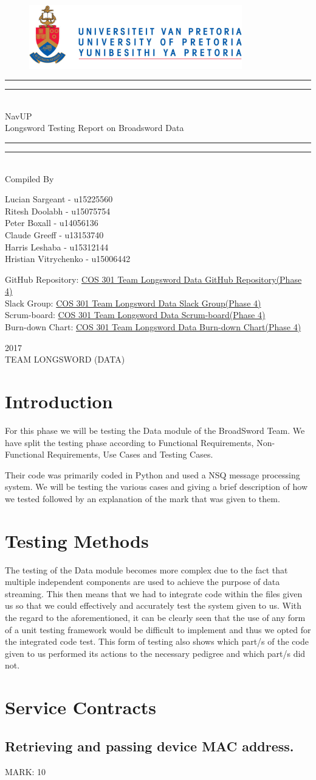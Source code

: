 \documentclass{article}
\newcommand*{\titleGP}{\begingroup
		\begin{figure}[t]
			\centering
			\includegraphics[width=350px]{UP_Logo.PNG}
		\end{figure}
\centering 
\vspace*{\baselineskip}

\rule{\textwidth}{1.6pt}\vspace*{-\baselineskip}\vspace*{2pt}
\rule{\textwidth}{0.4pt}\\[\baselineskip]

{\LARGE NavUP\\ [0.3\baselineskip] Longsword Testing Report on Broadsword Data } \\ [0.2\baselineskip]
\rule{\textwidth}{0.4pt}\vspace*{-\baselineskip}\vspace{3.2pt}
\rule{\textwidth}{1.6pt}\\[\baselineskip] %



Compiled By \\[\baselineskip]
{\Large Lucian Sargeant - u15225560 \\ Ritesh Doolabh - u15075754 \\ Peter Boxall -  u14056136 \\ Claude Greeff - u13153740\\ Harris Leshaba - u15312144 \\ Hristian Vitrychenko - u15006442\par}

\bigskip
\bigskip

 	GitHub Repository:  
 	\href{https://github.com/Chris19951225/COS-301-Longsword-Data-Streaming/tree/master/Testing\%2005.05.2017/Report\%20FINAL}{COS 301 Team Longsword Data GitHub Repository(Phase 4)}
\\
 	Slack Group:  
 	\href{https://cos301longsworddata.slack.com/messages/C4JMSNZGE/}{COS 301 Team Longsword Data Slack Group(Phase 4)}
 	\\
 	Scrum-board:  
 	\href{https://waffle.io/Chris19951225/COS-301-Longsword-Data-Streaming}{COS 301 Team Longsword Data Scrum-board(Phase 4)}
 	\\
 	Burn-down Chart:  
 	\href{https://waffle.io/Chris19951225/COS-301-Longsword-Data-Streaming/metrics/burndown?milestone=Testing\%20Phase\%20Deadline}{COS 301 Team Longsword Data Burn-down Chart(Phase 4)}




 

\vfill


{\scshape 2017} \\[0.3\baselineskip]
{\large TEAM LONGSWORD (DATA)}\par

\endgroup}
\begin{document}
\titleGP
\newpage
\tableofcontents

\newpage

\section{Introduction}
\begin{flushleft}
For this phase we will be testing the Data module of the BroadSword Team. We have split the testing phase according to Functional Requirements, Non-Functional Requirements, Use Cases and Testing Cases. 
\end{flushleft}

\begin{flushleft}
Their code was primarily coded in Python and used a NSQ message processing system.
We will be testing the various cases and giving a brief description of how we tested followed by an explanation of the mark that was given to them.
\end{flushleft}

\section{Testing Methods}
\begin{flushleft}
The testing of the Data module becomes more complex due to the fact that multiple independent components are used to achieve the purpose of data streaming. This then means that we had to integrate code within the files given us so that we could effectively and accurately test the system given to us. With the regard to the aforementioned, it can be clearly seen that the use of any form of a unit testing framework would be difficult to implement and thus we opted for the integrated code test. This form of testing also shows which part/s of the code given to us performed its actions to the necessary pedigree and which part/s did not.
\end{flushleft}

\newpage
\section{Service Contracts}

\subsection{Retrieving and passing device MAC address.}
\begin{flushleft}
MARK: 10
\end{flushleft}
\end{document}
